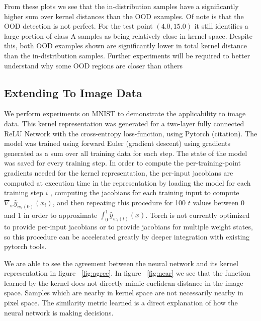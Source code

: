     From these plots we see that the in-distribution samples have a significantly higher sum over kernel distances than the OOD examples. Of note is that the OOD detection is not perfect. For the test point $\left(4.0, 15.0\right)$ it still identifies a large portion of class A samples as being relatively close in kernel space. Despite this, both OOD examples shown are significantly lower in total kernel distance than the in-distribution samples. Further experiments will be required to better understand why some OOD regions are closer than others

\subsection{Extending To Image Data}


    We perform experiments on MNIST to demonstrate the applicability to image data. 
    This kernel representation was generated for a two-layer fully connected ReLU Network with the cross-entropy loss-function, using Pytorch (citation). The model was trained using forward Euler (gradient descent) using gradients generated as a sum over all training data for each step. The state of the model was saved for every training step. In order to compute the per-training-point gradients needed for the kernel representation, the per-input jacobians are computed at execution time in the representation by loading the model for each training step $i$ , computing the jacobians for each training input to compute $\nabla_w \hat y_{w_s(0)}(x_i)$, and then repeating this procedure for 100 $t$ values between 0 and 1 in order to approximate $\int_0^1 \hat y_{w_s(t)}(x)$. Torch is not currently optimized to provide per-input jacobians or to provide jacobians for multiple weight states, so this procedure can be accelerated greatly by deeper integration with existing pytorch tools. 
    
    We are able to see the agreement between the neural network and its kernel representation in  figure ~\ref{fig:agree}. In figure ~\ref{fig:near} we see that the function learned by the kernel does not directly mimic euclidean distance in the image space. Samples which are nearby in kernel space are not necessarily nearby in pixel space. The similarity metric learned is a direct explanation of how the neural network is making decisions.

